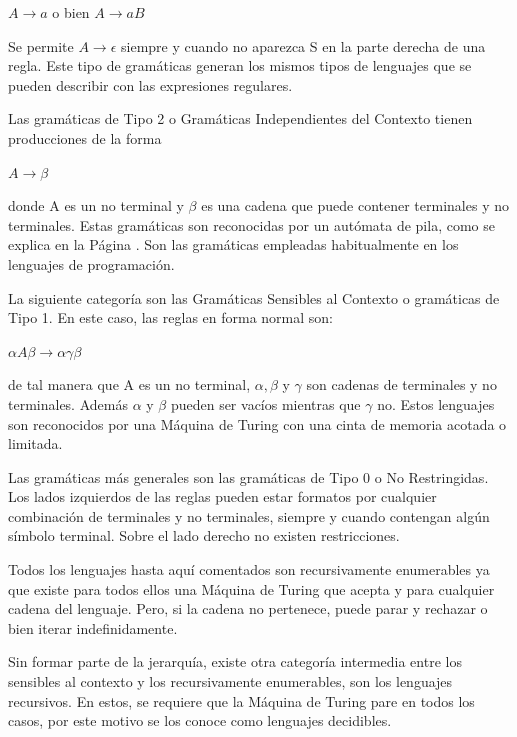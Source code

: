 \begin{center}
$A\rightarrow a$ o bien $A\rightarrow aB$
\end{center}

Se permite $A\rightarrow\epsilon$ siempre y cuando no aparezca S en la parte derecha de una regla. Este tipo de gramáticas generan los mismos tipos de lenguajes que se pueden describir con las expresiones regulares.

Las gramáticas de Tipo 2 o Gramáticas Independientes del Contexto tienen producciones de la forma 

\begin{center}
$A\rightarrow \beta$
\end{center}

donde A es un no terminal y $\beta$ es una cadena que puede contener terminales y no terminales. Estas gramáticas son reconocidas por un autómata de pila, como se explica en la Página \pageref{automatas-pila}. Son las gramáticas empleadas habitualmente en los lenguajes de programación.

La siguiente categoría son las Gramáticas Sensibles al Contexto o gramáticas de Tipo 1. En este caso, las reglas en forma normal son:

\begin{center}
$\alpha A\beta\rightarrow \alpha\gamma\beta$
\end{center}

de tal manera que A es un no terminal, $\alpha, \beta$ y $\gamma$ son cadenas de terminales y no terminales. Además $\alpha$ y $\beta$ pueden ser vacíos mientras que $\gamma$ no.
Estos lenguajes son reconocidos por una Máquina de Turing con una cinta de memoria acotada o limitada.

Las gramáticas más generales son las gramáticas de Tipo 0 o No Restringidas. Los lados izquierdos de las reglas pueden estar formatos por cualquier combinación de terminales y no terminales, siempre y cuando contengan algún símbolo terminal. Sobre el lado derecho no existen restricciones.

Todos los lenguajes hasta aquí comentados son recursivamente enumerables ya que existe para todos ellos una Máquina de Turing que acepta y para cualquier cadena del lenguaje. Pero, si la cadena no pertenece, puede parar y rechazar o bien iterar indefinidamente.

Sin formar parte de la jerarquía, existe otra categoría intermedia entre los sensibles al contexto y los recursivamente enumerables, son los lenguajes recursivos. En estos, se requiere que la Máquina de Turing pare en todos los casos, por este motivo se los conoce como lenguajes decidibles.

